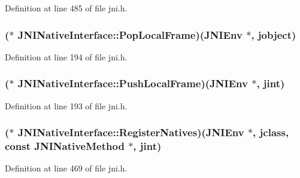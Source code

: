 Definition at line 485 of file jni.\-h.

\hypertarget{struct_j_n_i_native_interface_a8cefb3b99a596da613a95223513b313f}{
\subsubsection[{Pop\-Local\-Frame}]{($\ast$ J\-N\-I\-Native\-Interface\-::\-Pop\-Local\-Frame)({\bf J\-N\-I\-Env} $\ast$, {\bf jobject})}}\label{struct_j_n_i_native_interface_a8cefb3b99a596da613a95223513b313f}


Definition at line 194 of file jni.\-h.

\hypertarget{struct_j_n_i_native_interface_ae09ebe4927916666a4f66164c26d1b21}{
\subsubsection[{Push\-Local\-Frame}]{($\ast$ J\-N\-I\-Native\-Interface\-::\-Push\-Local\-Frame)({\bf J\-N\-I\-Env} $\ast$, {\bf jint})}}\label{struct_j_n_i_native_interface_ae09ebe4927916666a4f66164c26d1b21}


Definition at line 193 of file jni.\-h.

\hypertarget{struct_j_n_i_native_interface_a2bc02fa3fdfa74a8c2786cc71136258d}{
\subsubsection[{Register\-Natives}]{($\ast$ J\-N\-I\-Native\-Interface\-::\-Register\-Natives)({\bf J\-N\-I\-Env} $\ast$, {\bf jclass}, const {\bf J\-N\-I\-Native\-Method} $\ast$, {\bf jint})}}\label{struct_j_n_i_native_interface_a2bc02fa3fdfa74a8c2786cc71136258d}


Definition at line 469 of file jni.\-h.

